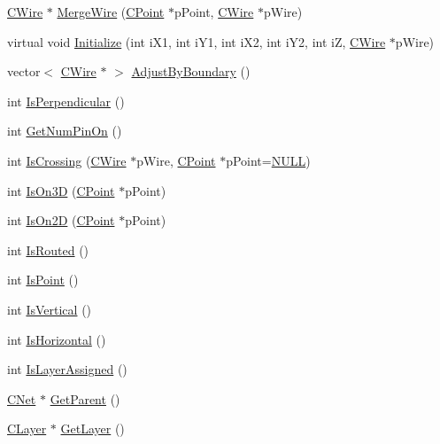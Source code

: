 \begin{DoxyCompactItemize}
\item 
\mbox{\hyperlink{classCWire}{C\+Wire}} $\ast$ \mbox{\hyperlink{classCWire_ac285ab926f7318d97773bbf31e00d4be}{Merge\+Wire}} (\mbox{\hyperlink{classCPoint}{C\+Point}} $\ast$p\+Point, \mbox{\hyperlink{classCWire}{C\+Wire}} $\ast$p\+Wire)
\item 
virtual void \mbox{\hyperlink{classCWire_abda250d5147d4fcf3721d4d89d238606}{Initialize}} (int i\+X1, int i\+Y1, int i\+X2, int i\+Y2, int iZ, \mbox{\hyperlink{classCWire}{C\+Wire}} $\ast$p\+Wire)
\item 
vector$<$ \mbox{\hyperlink{classCWire}{C\+Wire}} $\ast$ $>$ \mbox{\hyperlink{classCWire_a164104850603ca31076daf202401b77b}{Adjust\+By\+Boundary}} ()
\item 
int \mbox{\hyperlink{classCWire_aa724c8a82464a69ae346ca284f166754}{Is\+Perpendicular}} ()
\item 
int \mbox{\hyperlink{classCWire_a095a9358f9fe790d5010fef23a8a209e}{Get\+Num\+Pin\+On}} ()
\item 
int \mbox{\hyperlink{classCWire_a961f580e533277ae6c618f52f4c105e0}{Is\+Crossing}} (\mbox{\hyperlink{classCWire}{C\+Wire}} $\ast$p\+Wire, \mbox{\hyperlink{classCPoint}{C\+Point}} $\ast$p\+Point=\mbox{\hyperlink{BoxRouter_8h_a070d2ce7b6bb7e5c05602aa8c308d0c4}{N\+U\+LL}})
\item 
int \mbox{\hyperlink{classCWire_a4f6c29e13aad894c7bb57e59ae555421}{Is\+On3D}} (\mbox{\hyperlink{classCPoint}{C\+Point}} $\ast$p\+Point)
\item 
int \mbox{\hyperlink{classCWire_aa0addc021fd850f888ec7c703ffe91d7}{Is\+On2D}} (\mbox{\hyperlink{classCPoint}{C\+Point}} $\ast$p\+Point)
\item 
int \mbox{\hyperlink{classCWire_a8edc31661e3d037da712ad64cd7b8b5b}{Is\+Routed}} ()
\item 
int \mbox{\hyperlink{classCWire_a47047894df3b85fb3f5af6755002b4f6}{Is\+Point}} ()
\item 
int \mbox{\hyperlink{classCWire_a5459f08bfd3912aae672915a05bcfb38}{Is\+Vertical}} ()
\item 
int \mbox{\hyperlink{classCWire_a24f10d80a124f5929fcca8fb026c718d}{Is\+Horizontal}} ()
\item 
int \mbox{\hyperlink{classCWire_a58444c1e0db9838445654d85a3405741}{Is\+Layer\+Assigned}} ()
\item 
\mbox{\hyperlink{classCNet}{C\+Net}} $\ast$ \mbox{\hyperlink{classCWire_a98ece8df0778eb16cf0690c4aa5352f0}{Get\+Parent}} ()
\item 
\mbox{\hyperlink{classCLayer}{C\+Layer}} $\ast$ \mbox{\hyperlink{classCWire_a828800be53e43a40999877e9a56f8c20}{Get\+Layer}} ()

\end{DoxyCompactItemize}
